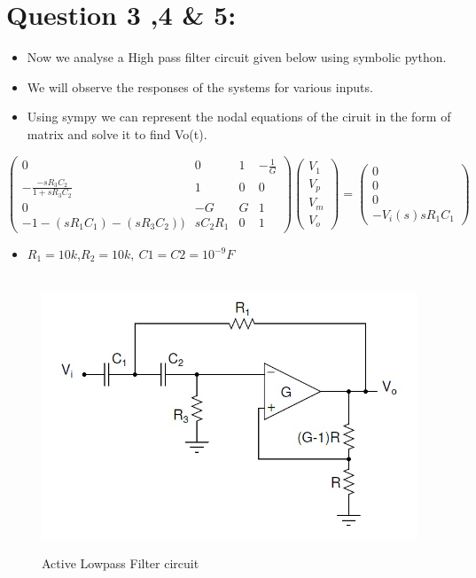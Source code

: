 \documentclass[11pt, a4paper]{article}
\begin{document}
\section{Question 3 ,4 \& 5:}\label{question-3-4-5}

\begin{itemize}

\item
  Now we analyse a High pass filter circuit given below using symbolic
  python.
\item
  We will observe the responses of the systems for various inputs.
\end{itemize}

\begin{itemize}

\item
  Using sympy we can represent the nodal equations of the ciruit in the
  form of matrix and solve it to find Vo(t).
\end{itemize}

\[\begin{pmatrix} 0 & 0 & 1 & -\frac{1}{G} \\ -\frac{-sR_3C_2}{1+sR_3C_2} & 1 & 0 & 0 \\ 0 & -G & G & 1 \\ -1-(sR_1C_1)-(sR_3C_2)) & sC_2R_1 & 0 & 1 \end{pmatrix}\begin{pmatrix} V_1 \\ V_p \\ V_m \\ V_o \end{pmatrix} = \begin{pmatrix} 0 \\ 0 \\ 0 \\ -V_i(s)sR_1C_1 \end{pmatrix}\]

\begin{itemize}
\item 
	$R_1 = 10k$,$ R_2 = 10k, \ C1 = C2 = 10^{-9} F$
\end{itemize}

\begin{figure}[!h]
\centering
\  \includegraphics[scale=0.5]{./../Extras/circuit2.jpeg}  %
\caption{Active Lowpass Filter circuit}
\end{figure}
\end{document}
